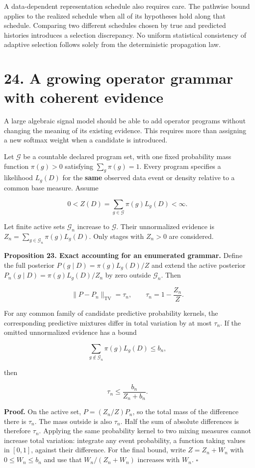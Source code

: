 \documentclass[11pt,letterpaper]{article}
\begin{document}
A data-dependent representation schedule also requires care. The
pathwise bound applies to the realized schedule when all of its
hypotheses hold along that schedule. Comparing two different schedules
chosen by true and predicted histories introduces a selection
discrepancy. No uniform statistical consistency of adaptive selection
follows solely from the deterministic propagation law.

\section{24. A growing operator grammar with coherent
evidence}\label{a-growing-operator-grammar-with-coherent-evidence}

A large algebraic signal model should be able to add operator programs
without changing the meaning of its existing evidence. This requires
more than assigning a new softmax weight when a candidate is introduced.

Let \(\mathcal G\) be a countable declared program set, with one fixed
probability mass function \(\pi(g)>0\) satisfying \(\sum_g\pi(g)=1\).
Every program specifies a likelihood \(L_g(D)\) for the \textbf{same}
observed data event or density relative to a common base measure. Assume

\[
0<Z(D)=\sum_{g\in\mathcal G}\pi(g)L_g(D)<\infty.
\]

Let finite active sets \(\mathcal G_n\) increase to \(\mathcal G\).
Their unnormalized evidence is
\(Z_n=\sum_{g\in\mathcal G_n}\pi(g)L_g(D)\). Only stages with \(Z_n>0\)
are considered.

\textbf{Proposition 23. Exact accounting for an enumerated grammar.}
Define the full posterior \(P(g\mid D)=\pi(g)L_g(D)/Z\) and extend the
active posterior \(P_n(g\mid D)=\pi(g)L_g(D)/Z_n\) by zero outside
\(\mathcal G_n\). Then

\[
\boxed{
\|P-P_n\|_{\mathrm{TV}}=\tau_n,
\qquad \tau_n=1-\frac{Z_n}{Z}.
}
\]

For any common family of candidate predictive probability kernels, the
corresponding predictive mixtures differ in total variation by at most
\(\tau_n\). If the omitted unnormalized evidence has a bound

\[
\sum_{g\notin\mathcal G_n}\pi(g)L_g(D)\leq b_n,
\]

then

\[
\tau_n\leq\frac{b_n}{Z_n+b_n}.
\]

\textbf{Proof.} On the active set, \(P=(Z_n/Z)P_n\), so the total mass
of the difference there is \(\tau_n\). The mass outside is also
\(\tau_n\). Half the sum of absolute differences is therefore
\(\tau_n\). Applying the same probability kernel to two mixing measures
cannot increase total variation: integrate any event probability, a
function taking values in \([0,1]\), against their difference. For the
final bound, write \(Z=Z_n+W_n\) with \(0\leq W_n\leq b_n\) and use that
\(W_n/(Z_n+W_n)\) increases with \(W_n\). \(\square\)
\end{document}
